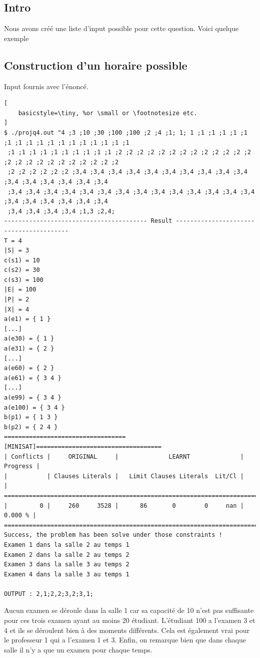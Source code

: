 \documentclass[a4paper,11pt]{article}
\begin{document}
\subsection{Intro}
Nous avons créé une liste d'input possible pour cette question. Voici quelque exemple
\subsection{Construction d'un horaire possible}
Input fournis avec l'énoncé.
\begin{lstlisting}[
    basicstyle=\tiny, %or \small or \footnotesize etc.
]
$ ./projq4.out "4 ;3 ;10 ;30 ;100 ;100 ;2 ;4 ;1; 1; 1 ;1 ;1 ;1 ;1 ;1 ;1 ;1 ;1 ;1 ;1 ;1 ;1 ;1 ;1 ;1 ;1 ;1
 ;1 ;1 ;1 ;1 ;1 ;1 ;1 ;1 ;1 ;1 ;2 ;2 ;2 ;2 ;2 ;2 ;2 ;2 ;2 ;2 ;2 ;2 ;2 ;2 ;2 ;2 ;2 ;2 ;2 ;2 ;2 ;2 ;2 ;2 
 ;2 ;2 ;2 ;2 ;2 ;2 ;3,4 ;3,4 ;3,4 ;3,4 ;3,4 ;3,4 ;3,4 ;3,4 ;3,4 ;3,4 ;3,4 ;3,4 ;3,4 ;3,4 ;3,4 ;3,4 
 ;3,4 ;3,4 ;3,4 ;3,4 ;3,4 ;3,4 ;3,4 ;3,4 ;3,4 ;3,4 ;3,4 ;3,4 ;3,4 ;3,4 ;3,4 ;3,4 ;3,4 ;3,4 ;3,4 ;3,4 
 ;3,4 ;3,4 ;3,4 ;3,4 ;1,3 ;2,4;
---------------------------------------- Result ----------------------------------------
T = 4
|S| = 3
c(s1) = 10
c(s2) = 30
c(s3) = 100
|E| = 100
|P| = 2
|X| = 4
a(e1) = { 1 }
[...]
a(e30) = { 1 }
a(e31) = { 2 }
[...]
a(e60) = { 2 }
a(e61) = { 3 4 }
[...]
a(e99) = { 3 4 }
a(e100) = { 3 4 }
b(p1) = { 1 3 }
b(p2) = { 2 4 }
==================================[MINISAT]===================================
| Conflicts |     ORIGINAL     |              LEARNT              | Progress |
|           | Clauses Literals |   Limit Clauses Literals  Lit/Cl |          |
==============================================================================
|         0 |     260     3528 |      86       0        0     nan |  0.000 % |
==============================================================================
Success, the problem has been solve under those constraints !
Examen 1 dans la salle 2 au temps 1
Examen 2 dans la salle 2 au temps 2
Examen 3 dans la salle 3 au temps 2
Examen 4 dans la salle 3 au temps 1

OUTPUT : 2,1;2,2;3,2;3,1;
\end{lstlisting}
Aucun examen se déroule dans la salle 1 car sa capacité de 10 n'est pas suffisante pour ces trois examen ayant au moins 20 étudiant.
L'étudiant 100 a l'examen 3 et 4 et ils se déroulent bien à des moments différents.
Cela est également vrai pour le professeur 1 qui a l'examen 1 et 3.
Enfin, on remarque bien que dans chaque salle il n'y a que un examen pour chaque temps.
\end{document}
